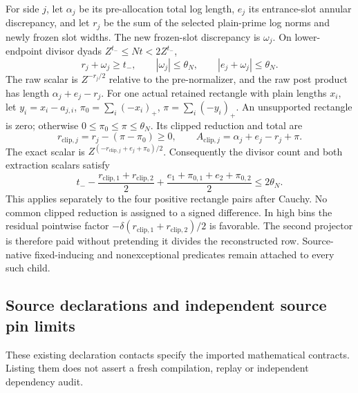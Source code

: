 \documentclass[11pt,a4paper]{article}
\begin{document}
For side \(j\), let \(\alpha_j\) be its pre-allocation total log length,
\(e_j\) its entrance-slot annular discrepancy, and let \(r_j\) be the
sum of the selected plain-prime log norms and newly frozen slot widths.
The new frozen-slot discrepancy is \(\omega_j\). On lower-endpoint
divisor dyads \(Z^{t_-}\le Nt<2Z^{t_-}\), \[
r_j+\omega_j\ge t_-,\qquad
|\omega_j|\le\theta_N,\qquad |e_j+\omega_j|\le\theta_N.
\] The raw scalar is \(Z^{-r_j/2}\) relative to the pre-normalizer, and
the raw post product has length \(\alpha_j+e_j-r_j\). For one actual
retained rectangle with plain lengths \(x_i\), let \(y_i=x_i-a_{j,i}\),
\(\pi_0=\sum_i(-x_i)_+\), \(\pi=\sum_i(-y_i)_+\). An unsupported
rectangle is zero; otherwise \(0\le\pi_0\le\pi\le\theta_N\). Its clipped
reduction and total are \[
r_{\mathrm{clip},j}=r_j-(\pi-\pi_0)\ge0,\qquad
A_{\mathrm{clip},j}=\alpha_j+e_j-r_j+\pi .
\] The exact scalar is \(Z^{(-r_{\mathrm{clip},j}+e_j+\pi_0)/2}\).
Consequently the divisor count and both extraction scalars satisfy \[
t_--\frac{r_{\mathrm{clip},1}+r_{\mathrm{clip},2}}2
 +\frac{e_1+\pi_{0,1}+e_2+\pi_{0,2}}2\le2\theta_N.
\] This applies separately to the four positive rectangle pairs after
Cauchy. No common clipped reduction is assigned to a signed difference.
In high bins the residual pointwise factor
\(-\delta(r_{\mathrm{clip},1}+r_{\mathrm{clip},2})/2\) is favorable. The
second projector is therefore paid without pretending it divides the
reconstructed row. Source-native fixed-inducing and nonexceptional
predicates remain attached to every such child.

\hypertarget{source-declarations-and-independent-source-pin-limits}{%
\subsection{Source declarations and independent source pin
limits}\label{source-declarations-and-independent-source-pin-limits}}

These existing declaration contacts specify the imported mathematical
contracts. Listing them does not assert a fresh compilation, replay or
independent dependency audit.
\end{document}
